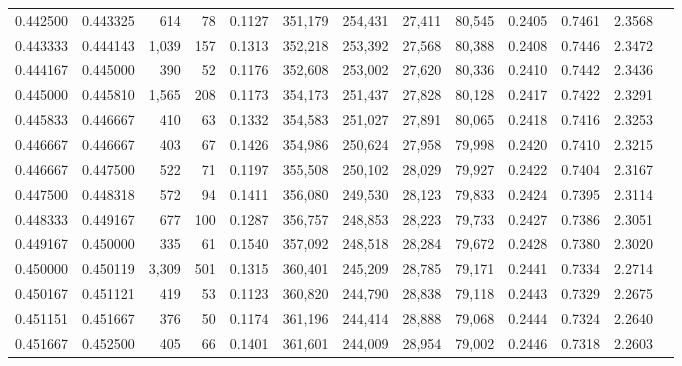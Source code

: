 \begin{tabular}{rrrrrrrrrrrrr}
0.442500 & 0.443325 &   614 &  78 &                                     0.1127 & 351,179 & 254,431 &  27,411 &  80,545 & 0.2405 & 0.7461 & 2.3568 \\
0.443333 & 0.444143 & 1,039 & 157 &                                     0.1313 & 352,218 & 253,392 &  27,568 &  80,388 & 0.2408 & 0.7446 & 2.3472 \\
0.444167 & 0.445000 &   390 &  52 &                                     0.1176 & 352,608 & 253,002 &  27,620 &  80,336 & 0.2410 & 0.7442 & 2.3436 \\
0.445000 & 0.445810 & 1,565 & 208 &                                     0.1173 & 354,173 & 251,437 &  27,828 &  80,128 & 0.2417 & 0.7422 & 2.3291 \\
0.445833 & 0.446667 &   410 &  63 &                                     0.1332 & 354,583 & 251,027 &  27,891 &  80,065 & 0.2418 & 0.7416 & 2.3253 \\
0.446667 & 0.446667 &   403 &  67 &                                     0.1426 & 354,986 & 250,624 &  27,958 &  79,998 & 0.2420 & 0.7410 & 2.3215 \\
0.446667 & 0.447500 &   522 &  71 &                                     0.1197 & 355,508 & 250,102 &  28,029 &  79,927 & 0.2422 & 0.7404 & 2.3167 \\
0.447500 & 0.448318 &   572 &  94 &                                     0.1411 & 356,080 & 249,530 &  28,123 &  79,833 & 0.2424 & 0.7395 & 2.3114 \\
0.448333 & 0.449167 &   677 & 100 &                                     0.1287 & 356,757 & 248,853 &  28,223 &  79,733 & 0.2427 & 0.7386 & 2.3051 \\
0.449167 & 0.450000 &   335 &  61 &                                     0.1540 & 357,092 & 248,518 &  28,284 &  79,672 & 0.2428 & 0.7380 & 2.3020 \\
0.450000 & 0.450119 & 3,309 & 501 &                                     0.1315 & 360,401 & 245,209 &  28,785 &  79,171 & 0.2441 & 0.7334 & 2.2714 \\
0.450167 & 0.451121 &   419 &  53 &                                     0.1123 & 360,820 & 244,790 &  28,838 &  79,118 & 0.2443 & 0.7329 & 2.2675 \\
0.451151 & 0.451667 &   376 &  50 &                                     0.1174 & 361,196 & 244,414 &  28,888 &  79,068 & 0.2444 & 0.7324 & 2.2640 \\
0.451667 & 0.452500 &   405 &  66 &                                     0.1401 & 361,601 & 244,009 &  28,954 &  79,002 & 0.2446 & 0.7318 & 2.2603 \\

\end{tabular}
